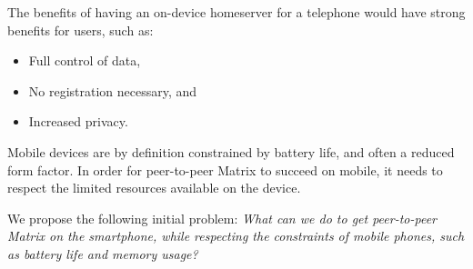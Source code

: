The benefits of having an on-device homeserver for a telephone would have strong benefits for users, such as:
\begin{itemize}
    \item Full control of data,
    \item No registration necessary, and
    \item Increased privacy.
\end{itemize}

\noindent Mobile devices are by definition constrained by battery life, and often a reduced form factor.
In order for peer-to-peer Matrix to succeed on mobile, it needs to respect the limited resources available on the device.


\begin{center}
    We propose the following initial problem: \textit{What can we do to get peer-to-peer Matrix on the smartphone, while respecting the constraints of mobile phones, such as battery life and memory usage?}
\end{center}

